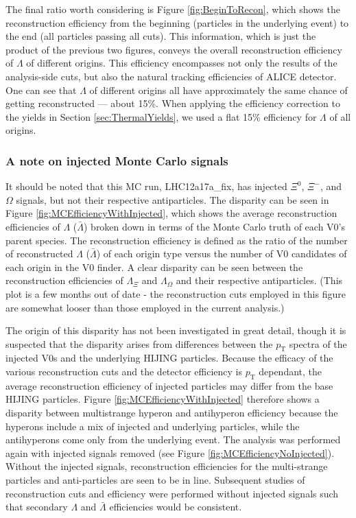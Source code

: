 The final ratio worth considering is Figure \ref{fig:BeginToRecon}, which shows the reconstruction efficiency from the beginning (particles in the underlying event) to the end (all particles passing all cuts).
This information, which is just the product of the previous two figures, conveys the overall reconstruction efficiency of $\Lambda$ of different origins.
This efficiency encompasses not only the results of the analysis-side cuts, but also the natural tracking efficiencies of ALICE detector.  
One can see that $\Lambda$ of different origins all have approximately the same chance of getting reconstructed --- about 15\%.
When applying the efficiency correction to the yields in Section \ref{sec:ThermalYields}, we used a flat 15\% efficiency for $\Lambda$ of all origins.

\subsubsection{A note on injected Monte Carlo signals}
\label{sec:InjectedMCSignals}

It should be noted that this MC run, LHC12a17a\_fix, has injected $\Xi^0$, $\Xi^-$, and $\Omega$ signals, but not their respective antiparticles.  The disparity can be seen in Figure \ref{fig:MCEfficiencyWithInjected}, which shows the average reconstruction efficiencies of $\Lambda$ ($\bar{\Lambda}$) broken down in terms of the Monte Carlo truth of each V0's parent species. 
The reconstruction efficiency is defined as the ratio of the number of reconstructed $\Lambda$ ($\bar{\Lambda}$) of each origin type versus the number of V0 candidates of each origin in the V0 finder.  
A clear disparity can be seen between the reconstruction efficiencies of $\Lambda_{\Xi}$ and $\Lambda_{\Omega}$ and their respective antiparticles.  
(This plot is a few months out of date - the reconstruction cuts employed in this figure are somewhat looser than those employed in the current analysis.)

The origin of this disparity has not been investigated in great detail, though it is suspected that the disparity arises from differences between the $p_\mathrm{T}$ spectra of the injected V0s and the underlying HIJING particles.  
Because the efficacy of the various reconstruction cuts and the detector efficiency is $p_\mathrm{T}$ dependant, the average reconstruction efficiency of injected particles may differ from the base HIJING particles.  
Figure \ref{fig:MCEfficiencyWithInjected} therefore shows a disparity between multistrange hyperon and antihyperon efficiency because the hyperons include a mix of injected and underlying particles, while the antihyperons come only from the underlying event. 
The analysis was performed again with injected signals removed (see Figure \ref{fig:MCEfficiencyNoInjected}).  
Without the injected signals, reconstruction efficiencies for the multi-strange particles and anti-particles are seen to be in line.  
Subsequent studies of reconstruction cuts and efficiency were performed without injected signals such that secondary $\Lambda$ and $\bar{\Lambda}$ efficiencies would be consistent.

